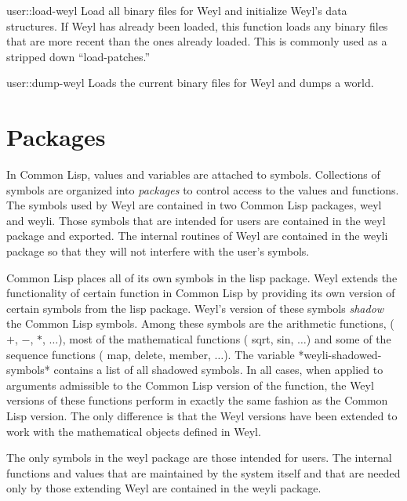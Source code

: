 \begin{functiondef}{user::load-weyl}{}
Load all binary files for Weyl and initialize Weyl's data structures.
If Weyl has already been loaded, this function loads any binary files
that are more recent than the ones already loaded.  This is commonly
used as a stripped down ``{\sf load-patches}.''
\end{functiondef}

\begin{functiondef}{user::dump-weyl}{}
Loads the current binary files for Weyl and dumps a world.
\end{functiondef}

\section{Packages}
\label{Weyl:Packages:Sec}

In Common Lisp, values and variables are attached to symbols.
Collections of symbols are organized into {\em packages} to control
access to the values and functions.  The symbols used by Weyl are
contained in two Common Lisp packages, {\sf weyl} and {\sf weyli}.
Those symbols that are intended for users are contained in the {\sf
weyl} package and exported.  The internal routines of Weyl are
contained in the {\sf weyli} package so that they will not interfere
with the user's symbols.

Common Lisp places all of its own symbols in the {\sf lisp} package.
Weyl extends the functionality of certain function in Common Lisp by
providing its own version of certain symbols from the {\sf lisp}
package.  Weyl's version of these symbols {\em shadow} the Common Lisp
symbols.  Among these symbols are the arithmetic functions, ($+$,
$-$, $*$, $\ldots$), most of the mathematical functions ({\sf
sqrt}, {\sf sin}, $\ldots$) and some of the sequence functions ({\sf
map}, {\sf delete}, {\sf member}, $\ldots$).  The variable {\sf
*weyli-shadowed-symbols*} contains a list of all shadowed symbols.  In
all cases, when applied to arguments admissible to the Common Lisp
version of the function, the Weyl versions of these functions perform
in exactly the same fashion as the Common Lisp version.  The only
difference is that the Weyl versions have been extended to work with
the mathematical objects defined in Weyl.

The only symbols in the {\sf weyl} package are those intended for
users.  The internal functions and values that are maintained by the
system itself and that are needed only by those extending Weyl are
contained in the {\sf weyli} package.

